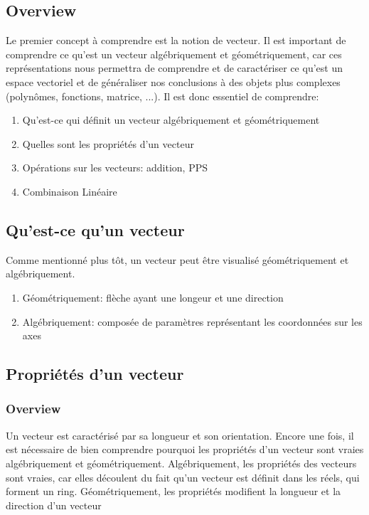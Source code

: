 \documentclass{article}
\begin{document}
\subsection{Overview}

Le premier concept à comprendre est la notion de vecteur. Il est important
de comprendre ce qu'est un vecteur algébriquement et géométriquement, car ces
représentations nous permettra de comprendre et de caractériser ce qu'est
un espace vectoriel et de généraliser nos conclusions à des objets plus
complexes (polynômes, fonctions, matrice, ...). Il est donc essentiel de
comprendre:
\begin{enumerate}
    \item Qu'est-ce qui définit un vecteur algébriquement et géométriquement
    \item Quelles sont les propriétés d'un vecteur
    \item Opérations sur les vecteurs: addition, PPS
    \item Combinaison Linéaire
\end{enumerate}

\subsection{Qu'est-ce qu'un vecteur}%
\label{ssub:Qu'est-ce qu'un vecteur}

Comme mentionné plus tôt, un vecteur peut être visualisé géométriquement et
algébriquement.
\begin{enumerate}
    \item Géométriquement: flèche ayant une longeur et une direction
    \item Algébriquement: composée de paramètres représentant les coordonnées
	sur les axes
\end{enumerate}

\subsection{Propriétés d'un vecteur}%
\label{ssub:Quelles sont les propriétés d'un vecteur}

\subsubsection{Overview}%
\label{ssub:Overview}

Un vecteur est caractérisé par sa longueur et son orientation. Encore une fois,
il est nécessaire de bien comprendre pourquoi les propriétés d'un vecteur sont
vraies algébriquement et géométriquement. Algébriquement, les propriétés des
vecteurs sont vraies, car elles découlent du fait qu'un vecteur est définit
dans les réels, qui forment un ring. Géométriquement, les propriétés modifient
la longueur et la direction d'un vecteur
\end{document}
